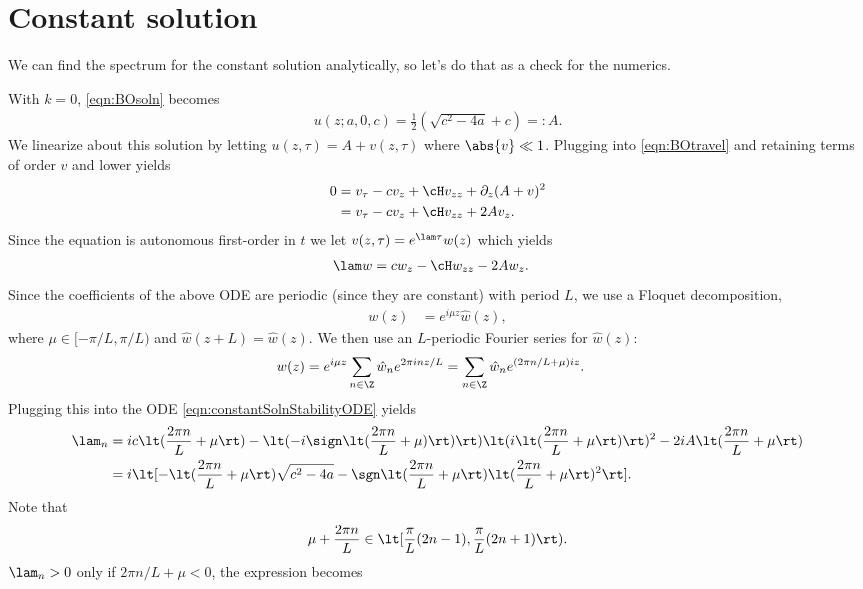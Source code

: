 \documentclass[a4paper,10pt]{article}
\begin{document}
\section{Constant solution}
We can find the spectrum for the constant solution analytically, so let's do
that as a check for the numerics.

With $k=0$, \eqref{eqn:BOsoln} becomes
\begin{align}
  u(z; a,0,c) = \frac12 (\sqrt{c^2-4a}+c) =: A.
\end{align}
We linearize about this solution by letting $u(z,\tau)= A + v(z,\tau)$ where
$\abs{v}\ll1$. Plugging into \eqref{eqn:BOtravel} and retaining terms of order
$v$ and lower yields
\begin{align}
  0 &= v_\tau -c v_z + \cH v_{zz} + \partial_z(A+v)^2\\
  &= v_\tau -cv_z + \cH v_{zz} + 2A v_z.
\end{align}
Since the equation is autonomous first-order in $t$ we let $v(z,\tau) = e^{\lam
\tau}w(z)$ which yields
\begin{align}
  \lam w &= c w_z -\cH w_{zz} - 2 A w_z.\label{eqn:constantSolnStabilityODE}
\end{align}
Since the coefficients of the above ODE are periodic (since they are constant)
with period $L$, we use a Floquet decomposition,
\begin{align}
  w(z) &= e^{i\mu z}\hat w(z) ,
\end{align}
where $\mu \in [-\pi/L, \pi/L)$ and $\hat w(z+L) = \hat w(z)$. We then use an
  $L$-periodic Fourier series for $\hat w(z)$:
\begin{align}
  w(z) &= e^{i\mu z} \sum_{n\in \Z} \hat w_n e^{2\pi i n z/L} = \sum_{n\in
  \Z}\hat w_n e^{(2\pi n/L + \mu)iz}.
\end{align}
Plugging this into the ODE \eqref{eqn:constantSolnStabilityODE} yields
\begin{align}
  \lam_n &= ic \lt(\frac{2\pi n}{L} + \mu\rt) - \lt(-i\sign\lt(\frac{2\pi
  n}{L}+\mu)\rt)\rt)\lt(i\lt(\frac{2\pi n}{L}+\mu\rt)\rt)^2 - 2iA \lt(\frac{2\pi
  n}{L}+\mu\rt)\\
  &= i\lt[ -\lt(\frac{2\pi n}{L}+\mu\rt)\sqrt{c^2-4a} - \sgn\lt(\frac{2\pi
  n}{L}+\mu\rt)\lt(\frac{2\pi n}{L}+\mu\rt)^2\rt].
\end{align}
Note that
\begin{align}
  \mu + \frac{2\pi n}{L} \in \lt[\frac \pi L (2n-1), \frac \pi L(2n+1)\rt).
\end{align}
$\lam_n>0$ only if $2\pi n/L+\mu<0$, the expression becomes
\end{document}
